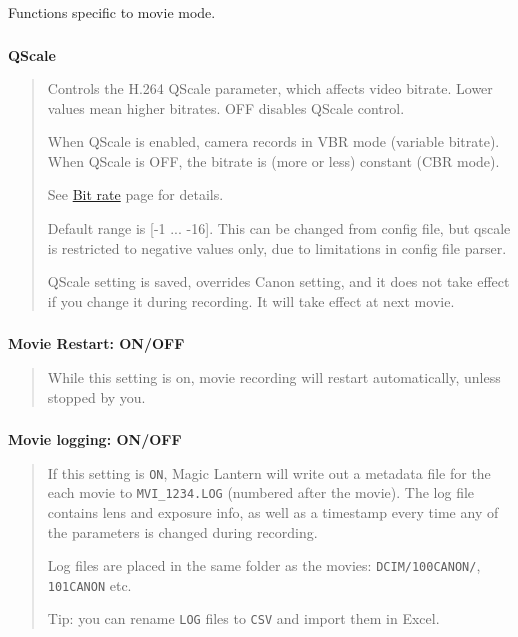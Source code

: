 \documentclass[a4paper,english]{article}
\begin{document}
Functions specific to movie mode.
\vspace{-10mm}\subsubsection*{}\label{qscale}
\textbf{QScale}
%
\begin{quote}

Controls the H.264 QScale parameter, which affects video bitrate.
Lower values mean higher bitrates. OFF disables QScale control.

When QScale is enabled, camera records in VBR mode (variable bitrate).
When QScale is OFF, the bitrate is (more or less) constant (CBR mode).

See \href{http://magiclantern.wikia.com/wiki/Bit\%20rate}{Bit rate} page for details.

Default range is {[}-1 ... -16{]}. This can be changed from config file,
but qscale is restricted to negative values only,
due to limitations in config file parser.

QScale setting is saved, overrides Canon setting, and it does not take effect if you change it during recording. It will take effect at next movie.

\end{quote}
\vspace{-10mm}\subsubsection*{}\label{auto-restart}
\textbf{Movie Restart: ON/OFF}
%
\begin{quote}

While this setting is on, movie recording will restart automatically, unless stopped by you.

\end{quote}
\vspace{-10mm}\subsubsection*{}\label{movie-logging}
\textbf{Movie logging: ON/OFF}
%
\begin{quote}

If this setting is \texttt{ON}, Magic Lantern will write out a metadata file for the each movie to \texttt{MVI\_1234.LOG} (numbered after the movie). The log file contains lens and exposure info, as well as a timestamp every time any of the parameters is changed during recording.

Log files are placed in the same folder as the movies: \texttt{DCIM/100CANON/}, \texttt{101CANON} etc.

Tip: you can rename \texttt{LOG} files to \texttt{CSV} and import them in Excel.

\end{quote}
\end{document}
